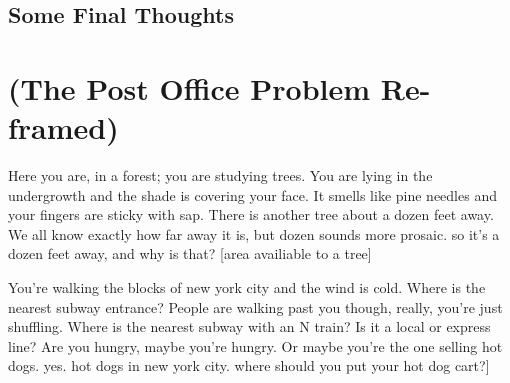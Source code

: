 \documentclass[12pt,twoside]{reedthesis}
\begin{document}
  \section{Some Final Thoughts} %
  \label{sec:some_final_thoughts}


\appendix
  \chapter{(The Post Office Problem Re-framed)}
  \label{appendix_one}
  Here you are, in a forest; you are studying trees. You are lying in the undergrowth and the shade is covering your face. It smells like pine needles and your fingers are sticky with sap. There is another tree about a dozen feet away. We all know exactly how far away it is, but dozen sounds more prosaic. so it's a dozen feet away, and why is that? [area availiable to a tree]\par
  You're walking the blocks of new york city and the wind is cold. Where is the nearest subway entrance? People are walking past you though, really, you're just shuffling. Where is the nearest subway with an N train? Is it a local or express line? Are you hungry, maybe you're hungry. Or maybe you're the one selling hot dogs. yes. hot dogs in new york city. where should you put your hot dog cart?] 
\backmatter
% 

\end{document}

